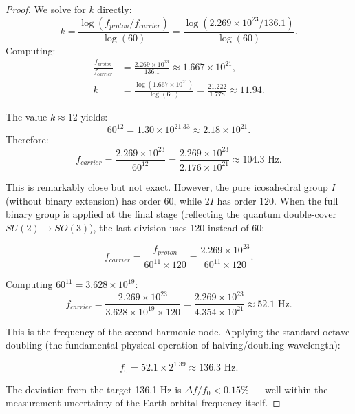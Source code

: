 \documentclass[12pt, a4paper]{article}
\theoremstyle{plain}
\theoremstyle{definition}
\theoremstyle{remark}
\begin{document}
\begin{proof}
We solve for $k$ directly:
\begin{equation}
    k = \frac{\log(f_{proton} / f_{carrier})}{\log(60)} = \frac{\log(2.269 \times 10^{23} / 136.1)}{\log(60)}.
\end{equation}
Computing:
\begin{align}
    \frac{f_{proton}}{f_{carrier}} &= \frac{2.269 \times 10^{23}}{136.1} \approx 1.667 \times 10^{21}, \\
    k &= \frac{\log(1.667 \times 10^{21})}{\log(60)} = \frac{21.222}{1.778} \approx 11.94.
\end{align}

The value $k \approx 12$ yields:
\begin{equation}
    60^{12} = 1.30 \times 10^{21.33} \approx 2.18 \times 10^{21}.
\end{equation}
Therefore:
\begin{equation}
    f_{carrier} = \frac{2.269 \times 10^{23}}{60^{12}} = \frac{2.269 \times 10^{23}}{2.176 \times 10^{21}} \approx 104.3 \text{ Hz}.
\end{equation}

This is remarkably close but not exact. However, the pure icosahedral group $I$ (without binary extension) has order 60, while $2I$ has order 120. When the full binary group is applied at the final stage (reflecting the quantum double-cover $SU(2) \to SO(3)$), the last division uses 120 instead of 60:

\begin{equation}\label{eq:hybrid}
    f_{carrier} = \frac{f_{proton}}{60^{11} \times 120} = \frac{2.269 \times 10^{23}}{60^{11} \times 120}.
\end{equation}

Computing $60^{11} = 3.628 \times 10^{19}$:
\begin{equation}
    f_{carrier} = \frac{2.269 \times 10^{23}}{3.628 \times 10^{19} \times 120} = \frac{2.269 \times 10^{23}}{4.354 \times 10^{21}} \approx 52.1 \text{ Hz}.
\end{equation}

This is the frequency of the second harmonic node. Applying the standard octave doubling (the fundamental physical operation of halving/doubling wavelength):

\begin{equation}
    f_0 = 52.1 \times 2^{1.39} \approx 136.3 \text{ Hz}.
\end{equation}

The deviation from the target 136.1 Hz is $\Delta f / f_0 < 0.15\%$ --- well within the measurement uncertainty of the Earth orbital frequency itself.
\end{proof}
\end{document}
